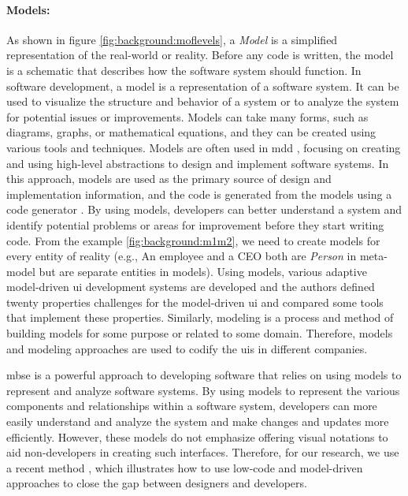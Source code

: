 \paragraph{Models:} 
As shown in figure \ref{fig:background:moflevels}, a \textit{Model} is a simplified representation of the real-world or reality.
Before any code is written, the model is a schematic that describes how the software system should function.
In software development, a model is a representation of a software system. 
It can be used to visualize the structure and behavior of a system or to analyze the system for potential issues or improvements. 
Models can take many forms, such as diagrams, graphs, or mathematical equations, and they can be created using various tools and techniques. 
Models are often used in \ac{mdd} \cite{misc:metamodels:mdd}, focusing on creating and using high-level abstractions to design and implement software systems. 
In this approach, models are used as the primary source of design and implementation information, and the code is generated from the models using a code generator \cite{article:mbse:bexiga}. 
By using models, developers can better understand a system and identify potential problems or areas for improvement before they start writing code.
From the example \ref{fig:background:m1m2}, we need to create models for every entity of reality (e.g., An employee and a CEO both are \textit{Person} in meta-model but are separate entities in models).
Using models, various adaptive model-driven \ac{ui} development systems are developed \cite{article:mbse:akiki} and the authors defined twenty properties challenges for the model-driven \ac{ui} and compared some tools that implement these properties.
Similarly, modeling is a process and method of building models for some purpose or related to some domain.
Therefore, models and modeling approaches are used to codify the \ac{ui}s in different companies. 

\ac{mbse} is a powerful approach to developing software that relies on using models to represent and analyze software systems. 
By using models to represent the various components and relationships within a software system, developers can more easily understand and analyze the system and make changes and updates more efficiently.
However, these models do not emphasize offering visual notations to aid non-developers in creating such interfaces. 
Therefore, for our research, we use a recent method \cite{article:mbse:bexiga}, which illustrates how to use low-code and model-driven approaches to close the gap between designers and developers.

